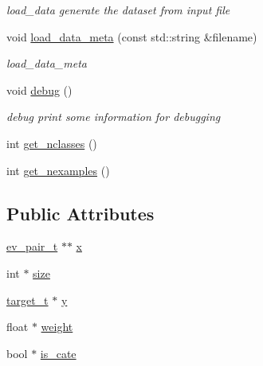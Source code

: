 \begin{DoxyCompactItemize}
\begin{DoxyCompactList}\small\item\em load\+\_\+data generate the dataset from input file \end{DoxyCompactList}\item 
void \hyperlink{classdataset_aeab51be94fab1f62e901555c82a016ae}{load\+\_\+data\+\_\+meta} (const std\+::string \&filename)
\begin{DoxyCompactList}\small\item\em load\+\_\+data\+\_\+meta \end{DoxyCompactList}\item 
void \hyperlink{classdataset_aeca876714406b8e391ab8cdeb31c9f3f}{debug} ()
\begin{DoxyCompactList}\small\item\em debug print some information for debugging \end{DoxyCompactList}\item 
int \hyperlink{classdataset_a35b101f3d8aecd5d87820982718f1534}{get\+\_\+nclasses} ()
\item 
int \hyperlink{classdataset_acd3afb9c245b9e11a6ed53ea293257a9}{get\+\_\+nexamples} ()
\end{DoxyCompactItemize}
\subsection*{Public Attributes}
\begin{DoxyCompactItemize}
\item 
\hyperlink{structev__pair__t}{ev\+\_\+pair\+\_\+t} $\ast$$\ast$ \hyperlink{classdataset_af7977ae76ce8f573f349e63f6500a8f8}{x}
\item 
int $\ast$ \hyperlink{classdataset_acc18732fc7fbc0fcdebffac620646eb9}{size}
\item 
\hyperlink{dataset_8h_a0f180d1f400ce1743488c55eb82a0a49}{target\+\_\+t} $\ast$ \hyperlink{classdataset_a146d2d2d0eaadeb342e76b9bb1004881}{y}
\item 
float $\ast$ \hyperlink{classdataset_ac6690ca832182b7cfa64da93a6ccd6ab}{weight}
\item 
bool $\ast$ \hyperlink{classdataset_ab856d84d4bced1ccde106badfab229d8}{is\+\_\+cate}
\end{DoxyCompactItemize}
